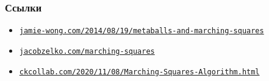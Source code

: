 \documentclass{beamer}
\begin{document}
\begin{frame}[fragile]
\frametitle{Ссылки}
\fontsize{8pt}{8pt}\selectfont
\begin{itemize}
\item \href{http://jamie-wong.com/2014/08/19/metaballs-and-marching-squares}{\nolinkurl{jamie-wong.com/2014/08/19/metaballs-and-marching-squares}}\item \href{http://jacobzelko.com/marching-squares/}{\nolinkurl{jacobzelko.com/marching-squares}}
\item \href{https://ckcollab.com/2020/11/08/Marching-Squares-Algorithm.html}{\nolinkurl{ckcollab.com/2020/11/08/Marching-Squares-Algorithm.html}}
\end{itemize}
\end{frame}
\end{document}

